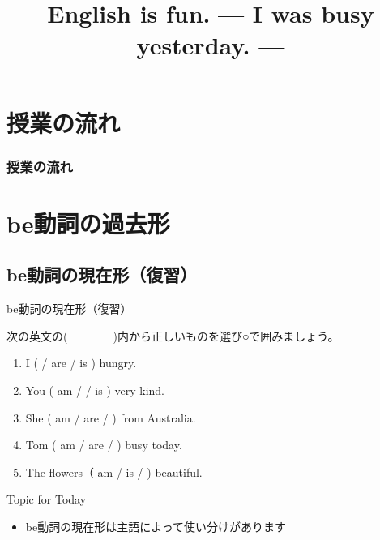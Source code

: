 \documentclass[aspectratio=169,xcolor={dvipsnames,table}]{beamer}
\title{English is fun.\,\,{}--- I was busy yesterday. ---}
\author{}
\institute[]{}
\date[]
\begin{document}
\begin{frame}[plain]
  \titlepage
\end{frame}

\section*{授業の流れ}
\begin{frame}[plain]
  \frametitle{授業の流れ}
  \tableofcontents
\end{frame}

\section{be動詞の過去形}

\subsection{be動詞の現在形（復習）}

\begin{frame}[plain]{be動詞の現在形（復習）}

次の英文の(~~~~~~~~)内から正しいものを選び○で囲みましょう。

\begin{enumerate}
 \item I (  / are  / is ) hungry.
 \item You ( am /  / is ) very kind.
 \item She ( am / are /  ) from Australia.
 \item Tom ( am / are /  ) busy today.
 \item The flowers（ am / is /  ) beautiful.
\end{enumerate}



\begin{exampleblock}{Topic for Today}
\pause
\begin{itemize}\small
 \item be動詞の現在形は主語によって使い分けがあります
\end{itemize}
     \end{exampleblock}

\end{frame}
\end{document}
